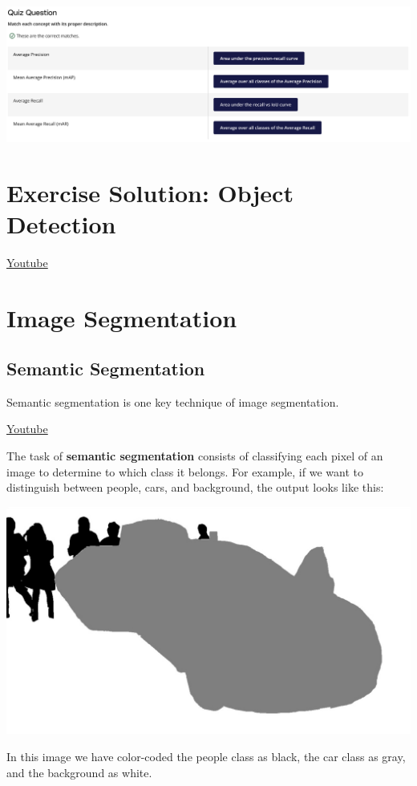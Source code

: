 \includegraphics[width=1\linewidth]{img//cnn//depth/image3.png}


\section{Exercise Solution: Object Detection}
\href{https://www.youtube.com/watch?v=xwxvb2Hnl8U&ab_channel=Udacity}{Youtube} \newline


\section{Image Segmentation}

\subsection{Semantic Segmentation}

Semantic segmentation is one key technique of image segmentation. \newline

\href{https://www.youtube.com/watch?v=EoNBzeKfpP8&ab_channel=Udacity}{Youtube} \newline

The task of \textbf{semantic segmentation} consists of classifying each pixel of an image to determine to which class it belongs. For example, if we want to distinguish between people, cars, and background, the output looks like this:

\includegraphics[width=0.5\linewidth]{img//cnn//object/segmentation.jpeg}

In this image we have color-coded the people class as black, the car class as gray, and the background as white. \newline

